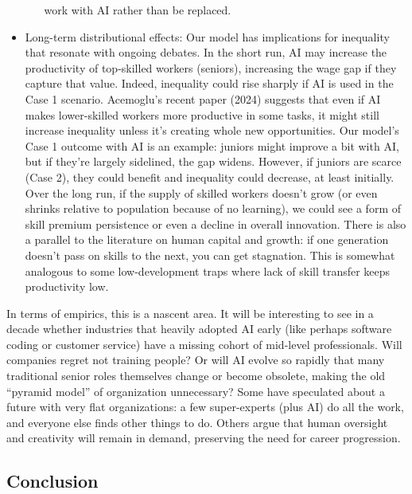 \documentclass[12pt]{article}
\begin{document}
\begin{itemize}
\begin{itemize}
    work with AI rather than be replaced.
  \end{itemize}
\item
  {Long-term distributional effects:} Our model has implications
  for inequality that resonate with ongoing debates. In the short run,
  AI may increase the productivity of top-skilled workers (seniors),
  increasing the wage gap if they capture that value. Indeed,
  {inequality could rise sharply} if AI is used in the Case 1
  scenario. Acemoglu's recent paper (2024) suggests that even if AI
  makes lower-skilled workers more productive in some tasks, it might
  {still} increase inequality unless it's creating whole new
  opportunities. Our model's Case 1 outcome with AI is an example:
  juniors might improve a bit with AI, but if they're largely sidelined,
  the gap widens. However, if juniors are scarce (Case 2), they could
  benefit and inequality could decrease, at least initially. Over the
  long run, if the supply of skilled workers doesn't grow (or even
  shrinks relative to population because of no learning), we could see a
  form of {skill premium persistence} or even a decline in
  overall innovation. There is also a parallel to the literature on
  {human capital and growth}: if one generation doesn't pass on
  skills to the next, you can get stagnation. This is somewhat analogous
  to some low-development traps where lack of skill transfer keeps
  productivity low.
\end{itemize}

In terms of {empirics}, this is a nascent area. It will be
interesting to see in a decade whether industries that heavily adopted
AI early (like perhaps software coding or customer service) have a
missing cohort of mid-level professionals. Will companies regret not
training people? Or will AI evolve so rapidly that many traditional
senior roles themselves change or become obsolete, making the old
``pyramid model'' of organization unnecessary? Some have speculated
about a future with {very flat organizations}: a few
super-experts (plus AI) do all the work, and everyone else finds other
things to do. Others argue that human oversight and creativity will
remain in demand, preserving the need for career progression.

\subsection{Conclusion}\label{conclusion}
\end{document}

